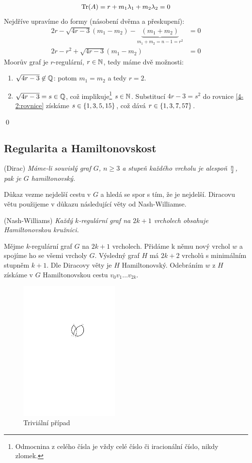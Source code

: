 \begin{align}
	\operatorname{Tr}(A) = r+m_1\lambda_1 + m_2\lambda_2 = 0
\end{align}
Nejdříve
upravíme do formy (násobení dvěma a přeskupení):
\begin{align}
	2r - \sqrt{4r-3}(m_1-m_2) - \underbrace{(m_1+m_2)}_{m_1+m_2=n-1=r^2} &= 0\\
	2r - r^2 + \sqrt{4r-3}(m_1 - m_2) &= 0 
	\label{4-2:rovnice}
\end{align}
Moorův graf je $r$-regulární, $r\in\mathbb{N}$, tedy máme dvě možnosti:
\begin{enumerate}
	\item $\sqrt{4r-3} \not\in \mathbb{Q}$: potom $m_1 = m_2$ a tedy $r = 2$.
	\item $\sqrt{4r-3} = s \in \mathbb{Q}$, což implikuje\footnote{Odmocnina z celého čísla je
  vždy celé číslo či iracionální číslo, nikdy zlomek.} $s \in \mathbb{N}$.
  Substitucí $4r - 3 = s^2$ do rovnice \ref{4-2:rovnice} získáme
	$s \in \{1, 3, 5, 15\}$, což dává $r \in \{1, 3, 7, 57\}$.
\end{enumerate}
\qed


\subsection{Regularita a Hamiltonovskost}
\vt (Dirac) {\it Máme-li souvislý graf $G$, $n \ge 3$ a stupeň každého vrcholu je alespoň $n\over 2$, pak je $G$ hamiltonovský.} 

Důkaz vezme nejdelší cestu v $G$ a hledá se spor s tím, že je nejdelší. Diracovu větu použijeme v důkazu následující věty od Nash-Williamse. 

\vt (Nash-Williams) {\it Každý $k$-regulární graf na $2k+1$ vrcholech obsahuje Hamiltonovskou kružnici.}

\dk Mějme $k$-regulární graf $G$ na $2k+1$ vrcholech. Přidáme k němu nový vrchol $w$ a spojíme ho se všemi vrcholy $G$. Výsledný graf $H$ má $2k+2$ vrcholů s minimálním stupněm $k+1$. Dle Diracovy věty je $H$ Hamiltonovský. Odebráním $w$ z $H$ získáme v $G$ Hamiltonovskou cestu $v_0v_1\dots v_{2k}$.

\begin{figure}
\centering
\includegraphics[width=5cm]{img/nash-williams4.pdf}
\caption{Triviální případ}
\label{dk:nw-triv}
\end{figure}

